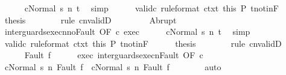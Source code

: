 \begin{isabellebody}
\ \ \ \ \isamarkupfalse%
\ {\isachardoublequoteopen}{\isasymGamma}{\isasymturnstile}{\isasymlangle}cNormal\ s{\isasymrangle}\ {\isacharequal}n{\isasymRightarrow}\ t{\isachardoublequoteclose}\ \isamarkupfalse%
\ simp\isanewline
\ \ \ \ \isamarkupfalse%
\ valid{\isacharunderscore}c{}\ {\isacharbrackleft}rule{\isacharunderscore}format{\isacharbrackright}\ ctxt\ this\ P\ t{\isacharunderscore}notin{\isacharunderscore}F\isanewline
\ \ \ \ \isamarkupfalse%
\ {\isacharquery}thesis\isanewline
\ \ \ \ \ \ \isamarkupfalse%
\ {\isacharparenleft}rule\ cnvalidD{\isacharparenright}\isanewline
\ \ \isamarkupfalse%
\isanewline
\ \ \ \ \isamarkupfalse%
\ Abrupt\isanewline
\ \ \ \ \isamarkupfalse%
\ inter{\isacharunderscore}guards{\isacharunderscore}execn{\isacharunderscore}noFault\ {\isacharbrackleft}OF\ c\ exec{\isacharbrackright}\isanewline
\ \ \ \ \isamarkupfalse%
\ {\isachardoublequoteopen}{\isasymGamma}{\isasymturnstile}{\isasymlangle}cNormal\ s{\isasymrangle}\ {\isacharequal}n{\isasymRightarrow}\ t{\isachardoublequoteclose}\ \isamarkupfalse%
\ simp\isanewline
\ \ \ \ \isamarkupfalse%
\ valid{\isacharunderscore}c{}\ {\isacharbrackleft}rule{\isacharunderscore}format{\isacharbrackright}\ ctxt\ this\ P\ t{\isacharunderscore}notin{\isacharunderscore}F\isanewline
\ \ \ \ \isamarkupfalse%
\ {\isacharquery}thesis\isanewline
\ \ \ \ \ \ \isamarkupfalse%
\ {\isacharparenleft}rule\ cnvalidD{\isacharparenright}\isanewline
\ \ \isamarkupfalse%
\isanewline
\ \ \ \ \isamarkupfalse%
\ {\isacharparenleft}Fault\ f{\isacharparenright}\isanewline
\ \ \ \ \isamarkupfalse%
\ exec\ inter{\isacharunderscore}guards{\isacharunderscore}execn{\isacharunderscore}Fault\ {\isacharbrackleft}OF\ c{\isacharbrackright}\isanewline
\ \ \ \ \isamarkupfalse%
\ {\isachardoublequoteopen}{\isasymGamma}{\isasymturnstile}{\isasymlangle}cNormal\ s{\isasymrangle}\ {\isacharequal}n{\isasymRightarrow}\ Fault\ f\ {\isasymor}\ {\isasymGamma}{\isasymturnstile}{\isasymlangle}cNormal\ s{\isasymrangle}\ {\isacharequal}n{\isasymRightarrow}\ Fault\ f{\isachardoublequoteclose}\isanewline
\ \ \ \ \ \ \isamarkupfalse%
\ auto\isanewline
\ \ \ \ \isamarkupfalse%

\end{isabellebody}
